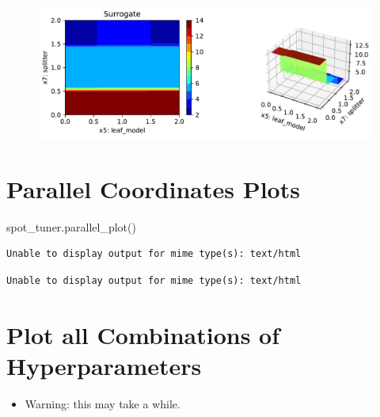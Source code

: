 \documentclass[
  letterpaper,
  DIV=11,
  numbers=noendperiod]{scrreprt}
\newenvironment{Shaded}{\begin{snugshade}}{\end{snugshade}}
\newcommand{\NormalTok}[1]{\textcolor[rgb]{0.00,0.23,0.31}{#1}}
\providecommand{\tightlist}{%
  \setlength{\itemsep}{0pt}\setlength{\parskip}{0pt}}\usepackage{longtable,booktabs,array}
\begin{document}
\begin{figure}[H]

{\centering \includegraphics{13_spot_hpt_river_files/figure-pdf/cell-44-output-4.pdf}

}

\end{figure}

\hypertarget{parallel-coordinates-plots}{%
\section{Parallel Coordinates Plots}\label{parallel-coordinates-plots}}

\begin{Shaded}
\begin{Highlighting}[]
\NormalTok{spot\_tuner.parallel\_plot()}
\end{Highlighting}
\end{Shaded}

\begin{verbatim}
Unable to display output for mime type(s): text/html
\end{verbatim}

\begin{verbatim}
Unable to display output for mime type(s): text/html
\end{verbatim}

\hypertarget{plot-all-combinations-of-hyperparameters-1}{%
\section{Plot all Combinations of
Hyperparameters}\label{plot-all-combinations-of-hyperparameters-1}}

\begin{itemize}
\tightlist
\item
  Warning: this may take a while.
\end{itemize}
\end{document}
